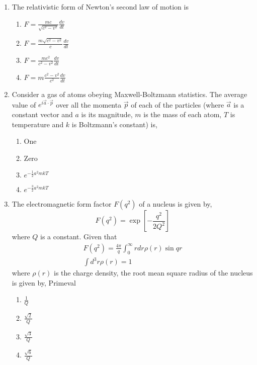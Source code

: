\documentclass[journal]{IEEEtran}
\begin{document}
\begin{enumerate}
  \item The relativistic form of Newton's second law of motion is
   \begin{multicols}{4}
			\begin{enumerate}
\item $F=\frac{m c}{\sqrt{c^{2}-v^{2}}} \frac{d v}{d t}$
\item $ F=\frac{m \sqrt{c^{2}-v^{2}}}{c} \frac{d v}{d t}$
\item  $F=\frac{m c^{2}}{c^{2}-v^{2}} \frac{d v}{d t}$
\item  $F=m \frac{{c}^{2}-{v}^{2}}{{c}^{2}} \frac{d v}{d t}$
   \end{enumerate}
		\end{multicols}
  \item Consider a gas of atoms obeying Maxwell-Boltzmann statistics. The average value of $e^{i \vec{a} \cdot \vec{p}}$ over all the momenta $\vec{p}$ of each of the particles (where $\vec{a}$ is a constant vector and $a$ is its magnitude, $m$ is the mass of each atom, $T$ is temperature and $k$ is Boltzmann's constant) is,
   \begin{multicols}{4}
			\begin{enumerate}
   \item  One
\item Zero
\item $e^{-\frac{1}{2} a^{2} m k T}$
\item $e^{-\frac{3}{2} a^{2} m k T}$
\end{enumerate}
		\end{multicols}
  \item The electromagnetic form factor $F(q^{2})$ of a nucleus is given by,
$$
F(q^{2})=\exp [-\frac{q^{2}}{2 Q^{2}}]
$$
where $Q$ is a constant. Given that
$$
\begin{gathered}
F(q^{2})=\frac{4 \pi}{q} \int_{0}^{\infty} r d r \rho(r) \sin q r \\
\int d^{3} r \rho(r)=1
\end{gathered}
$$
where $\rho(r)$ is the charge density, the root mean square radius of the nucleus is given by,
  Primeval
   \begin{multicols}{4}
			\begin{enumerate}
   \item $\frac{1} { Q}$
\item $\frac{\sqrt{2}}  {Q}$
\item$\frac{\sqrt{3}} { Q}$
\item $\frac{\sqrt{6}} { Q}$
\end{enumerate}

\end{multicols}
\end{enumerate}
\end{document}
